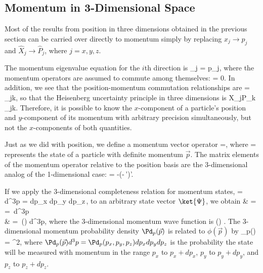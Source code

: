 \subsection{Momentum in 3-Dimensional Space}

Most of the results from position in three dimensions obtained in the previous section can be carried over directly to momentum simply by replacing $x_{j} \rightarrow p_{j}$ and $\hat{X}_{j} \rightarrow \hat{P}_{j}$, where $j = x,y,z$. 

The momentum eigenvalue equation for the $i$th direction is%
\beq
{}_{j} = p_{j},
\eeq\marginnote[-0.8cm]{\ref{tool:eigen}}%
% 
where the momentum operators are assumed to commute among themselves:
%
\beq
{} = 0.
\label{PP commute}
\eeq\marginnote[-0.7cm]{\ref{tool:commutator}}%
In addition, we see that the position-momentum commutation relationships are 
%
\beq
{} = \I\hbar\delta_{jk},
\label{XP commute}
\eeq\marginnote[-0.7cm]{\ref{tool:commutator}}%
so that the Heisenberg uncertainty principle in three dimensions is
%
\beq
\Delta X_{j}\Delta P_{k} \geq {}\delta_{jk}.
\eeq\marginnote[-0.7cm]{\ref{tool:genuncert}}%
Therefore, it is possible to know the $x$-component of a particle's position and $y$-component of its momentum with arbitrary precision simultaneously, but not the $x$-components of both quantities.

Just as we did with position, we define a momentum vector operator
\beq
{} =,
\eeq\marginnote[-0.7cm]{\ref{tool:eigen}}%
where
\beq
{} = 
\eeq%
represents the state of a particle with definite momentum $\vec{p}$.  The matrix elements of the momentum operator relative to the position basis are the 3-dimensional analog of the 1-dimensional case:
%
\beq
{} = -\I\hbar\delta(-\,')\vec{\nabla}'.
\eeq

If we apply the  3-dimensional  completeness relation for momentum states, 
%
\beq
 \onehat =  \int \,d^{3}p 
=  \intii dp_{x} \intii dp_{y} \intii dp_{z}\,,
\eeq
%
to an arbitrary state vector $\ket{\Psi}$, we obtain
%
\bas
\ket{\Psi} & =    \onehat \ket{\Psi} =  \int \,d^{3}p  \\
& =   \int  \,\phi()  d^{3}p,
\eas
%
where the 3-dimensional momentum wave function is
%
\beq
\phi() \equiv {}.
\eeq{}
%
The 3-dimensional momentum probability density $\Pd_{p}(\vec{p})$ is related to $\phi(\vec{p})$ by
%
\beq
\Pd_{p}() = ^{2},
\eeq
%
where $\Pd_{p}(\vec{p})d^{3}p = \Pd_{p}(p_{x},p_{y},p_{z})dp_{x}dp_{y}dp_{z}$ is the probability the state will be measured with momentum in the range $p_{x}$ to $p_{x} + dp_{x}$, $p_{y}$ to $p_{y} + dp_{y}$, and $p_{z}$ to $p_{z} + dp_{z}$.

